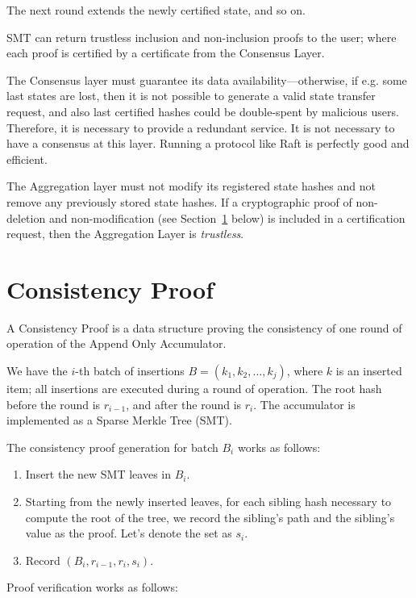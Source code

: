 \documentclass[twocolumn]{article}
\begin{document}
The next round extends the newly certified state, and so on.

SMT can return trustless inclusion and non-inclusion proofs to the user; where each proof is certified by a certificate from the Consensus Layer.

The Consensus layer must guarantee its data availability---otherwise, if e.g. some last states are lost, then it is not possible to generate a valid state transfer request, and also last certified hashes could be double-spent by malicious users. Therefore, it is necessary to provide a redundant service. It is not necessary to have a consensus at this layer. Running a protocol like Raft is perfectly good and efficient.

The Aggregation layer must not modify its registered state hashes and not remove any previously stored state hashes. If a cryptographic proof of non-deletion and non-modification (see Section~\ref{sec:consistency-proof} below) is included in a certification request, then the Aggregation Layer is \emph{trustless}.


\section{Consistency Proof}
\label{sec:consistency-proof}

A Consistency Proof is a data structure proving the consistency of one round of operation of the Append Only Accumulator.

We have the $i$-th batch of insertions $B = (k_1, k_2, \dots, k_j)$, where $k$ is an inserted item; all insertions are executed during a round of operation. The root hash before the round is $r_{i-1}$, and after the round is $r_i$. The accumulator is implemented as a Sparse Merkle Tree (SMT).

The consistency proof generation for batch $B_i$ works as follows:

\begin{enumerate}
    \item Insert the new SMT leaves in $B_i$.
    \item Starting from the newly inserted leaves, for each sibling hash necessary to compute the root of the tree, we record the sibling's path and the sibling's value as the proof. Let's denote the set as $s_i$.
    \item Record $(B_i, r_{i-1}, r_i, s_i)$.
\end{enumerate}

Proof verification works as follows:
\end{document}
